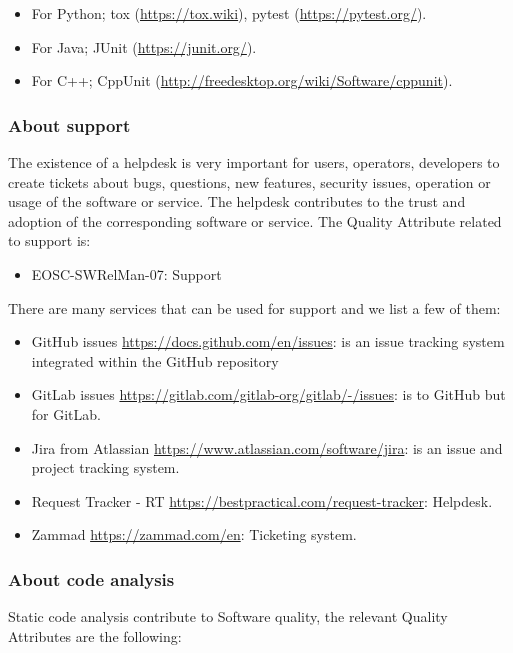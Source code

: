 \begin{itemize}
  \item For Python; tox (\url{https://tox.wiki}), pytest (\url{https://pytest.org/}).
  \item For Java; JUnit (\url{https://junit.org/}).
  \item For C++; CppUnit (\url{http://freedesktop.org/wiki/Software/cppunit}).
\end{itemize}

\subsubsection{About support}

The existence of a helpdesk is very important for users, operators, developers to create tickets about bugs, questions, new features, security issues, operation or usage of the software or service. The helpdesk contributes to the trust and adoption of the corresponding software or service. The Quality Attribute related to support is:

\begin{itemize}
  \item EOSC-SWRelMan-07: Support
\end{itemize}

There are many services that can be used for support and we list a few of them:

\begin{itemize}
  \item GitHub issues \url{https://docs.github.com/en/issues}: is an issue tracking system integrated within the GitHub repository
  \item GitLab issues \url{https://gitlab.com/gitlab-org/gitlab/-/issues}: is to GitHub but for GitLab.
  \item Jira from Atlassian \url{https://www.atlassian.com/software/jira}: is an issue and project tracking system.
  \item Request Tracker - RT \url{https://bestpractical.com/request-tracker}: Helpdesk.
  \item Zammad \url{https://zammad.com/en}: Ticketing system.
\end{itemize}

\subsubsection{About code analysis}

Static code analysis contribute to Software quality, the relevant Quality Attributes are the following:

